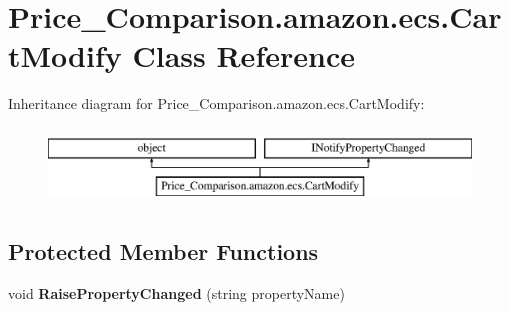 \hypertarget{class_price___comparison_1_1amazon_1_1ecs_1_1_cart_modify}{\section{Price\-\_\-\-Comparison.\-amazon.\-ecs.\-Cart\-Modify Class Reference}
\label{class_price___comparison_1_1amazon_1_1ecs_1_1_cart_modify}
}


 


Inheritance diagram for Price\-\_\-\-Comparison.\-amazon.\-ecs.\-Cart\-Modify\-:\begin{figure}[H]
\begin{center}
\leavevmode
\includegraphics[height=2.000000cm]{class_price___comparison_1_1amazon_1_1ecs_1_1_cart_modify}
\end{center}
\end{figure}
\subsection*{Protected Member Functions}
\begin{DoxyCompactItemize}
\item 
\hypertarget{class_price___comparison_1_1amazon_1_1ecs_1_1_cart_modify_a598892f249230aefa0053d3ce9170116}{void {\bfseries Raise\-Property\-Changed} (string property\-Name)}\label{class_price___comparison_1_1amazon_1_1ecs_1_1_cart_modify_a598892f249230aefa0053d3ce9170116}

\end{DoxyCompactItemize}
